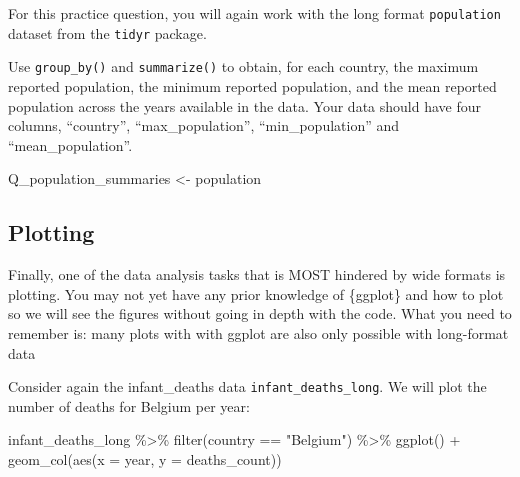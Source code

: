 \documentclass[
  letterpaper,
  DIV=11,
  numbers=noendperiod]{scrreprt}
\newenvironment{Shaded}{\begin{snugshade}}{\end{snugshade}}
\newcommand{\AttributeTok}[1]{\textcolor[rgb]{0.40,0.45,0.13}{#1}}
\newcommand{\FunctionTok}[1]{\textcolor[rgb]{0.28,0.35,0.67}{#1}}
\newcommand{\NormalTok}[1]{\textcolor[rgb]{0.00,0.23,0.31}{#1}}
\newcommand{\OtherTok}[1]{\textcolor[rgb]{0.00,0.23,0.31}{#1}}
\newcommand{\SpecialCharTok}[1]{\textcolor[rgb]{0.37,0.37,0.37}{#1}}
\newcommand{\StringTok}[1]{\textcolor[rgb]{0.13,0.47,0.30}{#1}}
\begin{document}
\begin{tcolorbox}[enhanced jigsaw, titlerule=0mm, colback=white, left=2mm, breakable, opacitybacktitle=0.6, colbacktitle=quarto-callout-tip-color!10!white, colframe=quarto-callout-tip-color-frame, bottomtitle=1mm, opacityback=0, coltitle=black, arc=.35mm, toptitle=1mm, title=\textcolor{quarto-callout-tip-color}{\faLightbulb}\hspace{0.5em}{Practice}, leftrule=.75mm, toprule=.15mm, bottomrule=.15mm, rightrule=.15mm]

For this practice question, you will again work with the long format
\texttt{population} dataset from the \texttt{tidyr} package.

Use \texttt{group\_by()} and \texttt{summarize()} to obtain, for each
country, the maximum reported population, the minimum reported
population, and the mean reported population across the years available
in the data. Your data should have four columns, ``country'',
``max\_population'', ``min\_population'' and ``mean\_population''.

\begin{Shaded}
\begin{Highlighting}[]
\NormalTok{Q\_population\_summaries }\OtherTok{\textless{}{-}} 
\NormalTok{  population}
\end{Highlighting}
\end{Shaded}

\end{tcolorbox}

\subsection{Plotting}\label{plotting}

Finally, one of the data analysis tasks that is MOST hindered by wide
formats is plotting. You may not yet have any prior knowledge of
\{ggplot\} and how to plot so we will see the figures without going in
depth with the code. What you need to remember is: many plots with with
ggplot are also only possible with long-format data

Consider again the infant\_deaths data \texttt{infant\_deaths\_long}. We
will plot the number of deaths for Belgium per year:

\begin{Shaded}
\begin{Highlighting}[]
\NormalTok{infant\_deaths\_long }\SpecialCharTok{\%\textgreater{}\%} 
  \FunctionTok{filter}\NormalTok{(country }\SpecialCharTok{==} \StringTok{"Belgium"}\NormalTok{) }\SpecialCharTok{\%\textgreater{}\%} 
  \FunctionTok{ggplot}\NormalTok{() }\SpecialCharTok{+} 
  \FunctionTok{geom\_col}\NormalTok{(}\FunctionTok{aes}\NormalTok{(}\AttributeTok{x =}\NormalTok{ year, }\AttributeTok{y =}\NormalTok{ deaths\_count))}
\end{Highlighting}
\end{Shaded}
\end{document}
